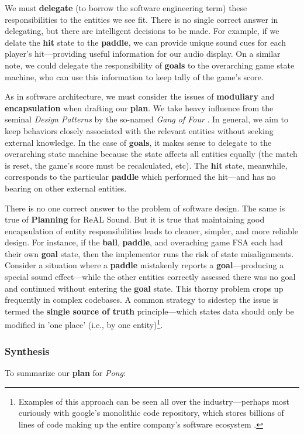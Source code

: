 \documentclass{report}
\newcommand{\rs}{ReAL Sound\xspace}
\newcommand{\plan}{\textbf{Planning}\xspace}
\newcommand{\state}[1]{\textbf{#1}}
\newcommand{\pad}{\textbf{paddle}\xspace}
\newcommand{\ball}{\textbf{ball}\xspace}
\newcommand{\tech}[1]{\textbf{#1}}
\begin{document}
We must \tech{delegate} (to borrow the software engineering term) these responsibilities to the entities we see fit. There is no single correct answer in delegating, but there are intelligent decisions to be made. For example, if we delate the \state{hit} state to the \pad, we can provide unique sound cues for each player's hit---providing useful information for our audio display. On a similar note, we could delegate the responsibility of \state{goals} to the overarching game state machine, who can use this information to keep tally of the game's score. 

As in software architecture, we must consider the issues of \tech{moduliary} and \tech{encapsulation} when drafting our \state{plan}. We take heavy influence from the seminal \emph{Design Patterns} by the so-named \emph{Gang of Four} \cite{gamma1994design}. In general, we aim to keep behaviors closely associated with the relevant entities without seeking external knowledge. In the case of \state{goals}, it makes sense to delegate to the overarching state machine because the state affects all entities equally (the match is reset, the game's score must be recalculated, etc). The \state{hit} state, meanwhile, corresponds to the particular \pad which performed the hit---and has no bearing on other external entities. 

There is no one correct answer to the problem of software design. The same is true of \plan for \rs. But it is true that maintaining good encapsulation of entity responsibilities leads to cleaner, simpler, and more reliable design. For instance, if the \ball, \pad, and overaching game FSA each had their own \state{goal} state, then the implementor runs the risk of state misalignments. Consider a situation where a \pad mistakenly reports a \state{goal}---producing a special sound effect---while the other entities correctly assessed there was no goal and continued without entering the \state{goal} state. This thorny problem crops up frequently in complex codebases. A common strategy to sidestep the issue is termed the \tech{single source of truth} principle---which states data should only be modified in 'one place' (i.e., by one entity)\footnote{Examples of this approach can be seen all over the industry---perhaps most curiously with google's monolithic code repository, which stores billions of lines of code making up the entire company's software ecosystem \cite{googleRepo}.}.

\subsubsection{Synthesis}
To summarize our \state{plan} for \emph{Pong}:
\end{document}
